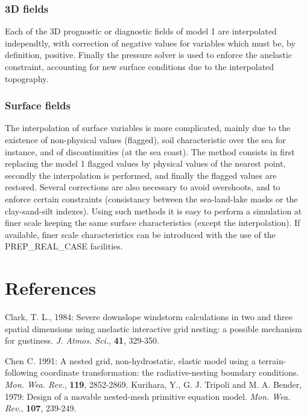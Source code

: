 \subsubsection{3D fields}

 Each of the 3D prognostic or diagnostic fields of model 1 are interpolated
independtly, with correction of negative values for variables which must be,
by definition, positive. Finally the pressure solver is used to enforce the
anelastic constraint, accounting for new surface conditions due
to the interpolated topography.

\subsubsection{Surface fields}

 The interpolation of surface variables is more complicated, mainly due
to the existence of non-physical values (flagged), soil characteristic over the
sea for instance, and of discontinuities (at the sea coast).
 The method consists in first replacing the model 1 flagged values by
physical values of the nearest point, secondly the interpolation is
performed, and finally the flagged values are restored. Several corrections
are also necessary to avoid overshoots, and to enforce certain constraints
(consistancy between the sea-land-lake masks or the clay-sand-silt indexes).
Using such methods it is easy to perform a simulation at finer scale keeping
the same surface characteristics (except the interpolation). If
available, finer scale characteristics can be introduced with the use of
the PREP\_REAL\_CASE facilities.

\section*{References}
\parindent 0cm

\por
Clark, T. L., 1984: Severe downslope windstorm calculations in two and three
spatial dimensions using anelastic interactive grid nesting: a possible
mechanism for gustiness. {\it J. Atmos. Sci.},  {\bf 41}, 329-350.

\por
Chen C. 1991:
A nested grid, non-hydrostatic, elastic model using a terrain-following
coordinate transformation: the radiative-nesting boundary conditions.
{\it Mon. Wea. Rev.},  {\bf 119}, 2852-2869.
\por
Kurihara, Y., G. J. Tripoli and M. A. Bender, 1979:
Design of a movable nested-mesh primitive equation model.
{\it Mon. Wea. Rev.},  {\bf 107}, 239-249.



